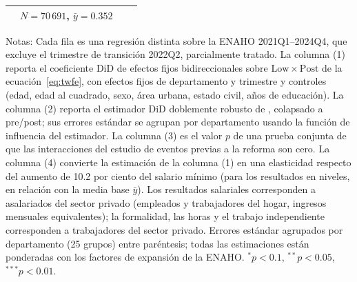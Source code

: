 \begin{table}[!tbp]
\begin{threeparttable}
\begin{tabular}{lcccc}
 & \multicolumn{2}{c}{\footnotesize $N=70\,691$, $\bar{y}=0.352$} & & \\
\bottomrule
\end{tabular}
\begin{tablenotes}\footnotesize
\item Notas: Cada fila es una regresión distinta sobre la ENAHO 2021Q1--2024Q4, que excluye el trimestre de transición 2022Q2, parcialmente tratado. La columna (1) reporta el coeficiente DiD de efectos fijos bidireccionales sobre $\mathrm{Low}\times\mathrm{Post}$ de la ecuación~\eqref{eq:twfe}, con efectos fijos de departamento y trimestre y controles (edad, edad al cuadrado, sexo, área urbana, estado civil, años de educación). La columna (2) reporta el estimador DiD doblemente robusto de \citet{santanna_zhao_2020}, colapsado a pre/post; sus errores estándar se agrupan por departamento usando la función de influencia del estimador. La columna (3) es el valor $p$ de una prueba conjunta de que las interacciones del estudio de eventos previas a la reforma son cero. La columna (4) convierte la estimación de la columna (1) en una elasticidad respecto del aumento de 10.2 por ciento del salario mínimo (para los resultados en niveles, en relación con la media base $\bar{y}$). Los resultados salariales corresponden a asalariados del sector privado (empleados y trabajadores del hogar, ingresos mensuales equivalentes); la formalidad, las horas y el trabajo independiente corresponden a trabajadores del sector privado. Errores estándar agrupados por departamento (25 grupos) entre paréntesis; todas las estimaciones están ponderadas con los factores de expansión de la ENAHO. $^{*}p<0.1$, $^{**}p<0.05$, $^{***}p<0.01$.
\end{tablenotes}
\end{threeparttable}\end{table}
